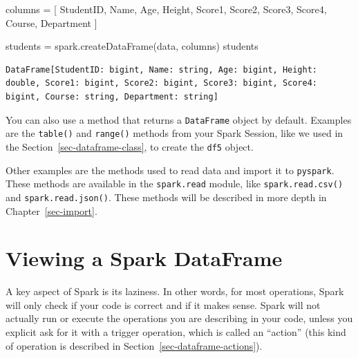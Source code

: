 \documentclass[
  11pt,
  letterpaper,
  DIV=11,
  numbers=noendperiod]{scrreprt}
\newenvironment{Shaded}{\begin{snugshade}}{\end{snugshade}}
\newcommand{\NormalTok}[1]{\textcolor[rgb]{0.00,0.23,0.31}{#1}}
\newcommand{\OperatorTok}[1]{\textcolor[rgb]{0.37,0.37,0.37}{#1}}
\newcommand{\StringTok}[1]{\textcolor[rgb]{0.13,0.47,0.30}{#1}}
\begin{document}
\begin{Shaded}
\begin{Highlighting}[]
\NormalTok{columns }\OperatorTok{=}\NormalTok{ [}
  \StringTok{\textquotesingle{}StudentID\textquotesingle{}}\NormalTok{, }\StringTok{\textquotesingle{}Name\textquotesingle{}}\NormalTok{, }\StringTok{\textquotesingle{}Age\textquotesingle{}}\NormalTok{, }\StringTok{\textquotesingle{}Height\textquotesingle{}}\NormalTok{, }\StringTok{\textquotesingle{}Score1\textquotesingle{}}\NormalTok{,}
  \StringTok{\textquotesingle{}Score2\textquotesingle{}}\NormalTok{, }\StringTok{\textquotesingle{}Score3\textquotesingle{}}\NormalTok{, }\StringTok{\textquotesingle{}Score4\textquotesingle{}}\NormalTok{, }\StringTok{\textquotesingle{}Course\textquotesingle{}}\NormalTok{, }\StringTok{\textquotesingle{}Department\textquotesingle{}}
\NormalTok{]}

\NormalTok{students }\OperatorTok{=}\NormalTok{ spark.createDataFrame(data, columns)}
\NormalTok{students}
\end{Highlighting}
\end{Shaded}

\begin{verbatim}
DataFrame[StudentID: bigint, Name: string, Age: bigint, Height: double, Score1: bigint, Score2: bigint, Score3: bigint, Score4: bigint, Course: string, Department: string]
\end{verbatim}

You can also use a method that returns a \texttt{DataFrame} object by
default. Examples are the \texttt{table()} and \texttt{range()} methods
from your Spark Session, like we used in the
Section~\ref{sec-dataframe-class}, to create the \texttt{df5} object.

Other examples are the methods used to read data and import it to
\texttt{pyspark}. These methods are available in the \texttt{spark.read}
module, like \texttt{spark.read.csv()} and \texttt{spark.read.json()}.
These methods will be described in more depth in
Chapter~\ref{sec-import}.

\hypertarget{sec-viewing-a-dataframe}{%
\section{Viewing a Spark DataFrame}\label{sec-viewing-a-dataframe}}

A key aspect of Spark is its laziness. In other words, for most
operations, Spark will only check if your code is correct and if it
makes sense. Spark will not actually run or execute the operations you
are describing in your code, unless you explicit ask for it with a
trigger operation, which is called an ``action'' (this kind of operation
is described in Section~\ref{sec-dataframe-actions}).
\end{document}
